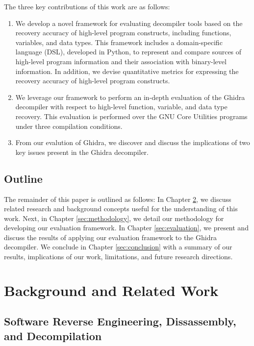 The three key contributions of this work are as follows:
\begin{enumerate}
    \item We develop a novel framework for evaluating decompiler tools based on the recovery accuracy of high-level program constructs, including functions, variables, and data types. This framework includes a domain-specific language (DSL), developed in Python, to represent and compare sources of high-level program information and their association with binary-level information. In addition, we devise quantitative metrics for expressing the recovery accuracy of high-level program constructs.
    \item We leverage our framework to perform an in-depth evaluation of the Ghidra decompiler with respect to high-level function, variable, and data type recovery. This evaluation is performed over the GNU Core Utilities programs under three compilation conditions.
    \item From our evalution of Ghidra, we discover and discuss the implications of two key issues present in the Ghidra decompiler.
\end{enumerate}

\section{Outline}

The remainder of this paper is outlined as follows: In Chapter \ref{sec:background-related-work}, we discuss related research and background concepts useful for the understanding of this work. Next, in Chapter \ref{sec:methodology}, we detail our methodology for developing our evaluation framework. In Chapter \ref{sec:evaluation}, we present and discuss the results of applying our evaluation framework to the Ghidra decompiler. We conclude in Chapter \ref{sec:conclusion} with a summary of our results, implications of our work, limitations, and future research directions.

\chapter{Background and Related Work} \label{sec:background-related-work}

\section{Software Reverse Engineering, Dissassembly, and Decompilation}

